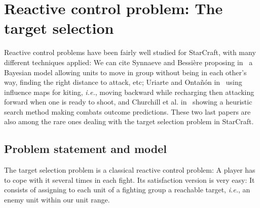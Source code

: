 \documentclass[journal]{IEEEtran}
\newcommand{\ghost}{\textsc{GHOST}\xspace}
\newcommand{\ie}{\textit{i.e.}}
\begin{document}

\section{Reactive control problem: The target selection}\label{sec:target}

Reactive control problems have been fairly well studied for StarCraft,
with  many different  techniques  applied: We  can  cite Synnaeve  and
Bessi{\`e}re  proposing   in~\cite{SynnaeveB11-b}  a   Bayesian  model
allowing units  to move in  group without  being in each  other's way,
finding the right distance to attack, etc; Uriarte and Onta{\~n}{\'o}n
in~\cite{UriarteO12}  using influence  maps  for  kiting, \ie,  moving
backward while recharging then attacking  forward when one is ready to
shoot,  and Churchill  et  al.  in~\cite{ChurchillSB12,  ChurchillB12}
showing a heuristic search  method making combats outcome predictions.
These two  last papers are also  among the rare ones  dealing with the
target selection problem in StarCraft.

\subsection{Problem statement and model}

The target selection problem is  a classical reactive control problem:
A  player has  to  cope with  it  several times  in  each fight.   Its
satisfaction version  is very easy:  It consists of assigning  to each
unit of a fighting group a reachable target, \ie, an enemy unit within
our unit range.
\end{document}
